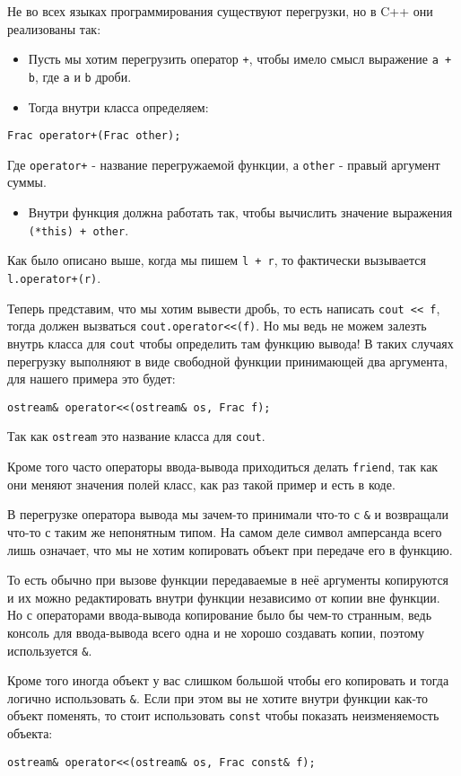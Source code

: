 Не во всех языках программирования существуют перегрузки, но в C++ они реализованы так:
\begin{itemize}
    \item Пусть мы хотим перегрузить оператор \texttt{+}, чтобы имело смысл выражение \texttt{a + b}, где \texttt{a} и \texttt{b} дроби.
    \item Тогда внутри класса определяем:
\end{itemize}
\begin{verbatim}
Frac operator+(Frac other);
\end{verbatim}
Где \texttt{operator+} - название перегружаемой функции, а \texttt{other} - правый аргумент суммы.
\begin{itemize}
    \item Внутри функция должна работать так, чтобы вычислить значение выражения \texttt{(*this) + other}.
\end{itemize}


Как было описано выше, когда мы пишем \texttt{l + r}, то фактически вызывается \texttt{l.operator+(r)}.

Теперь представим, что мы хотим вывести дробь, то есть написать \texttt{cout << f}, тогда должен вызваться \texttt{cout.operator<<(f)}. Но мы ведь не можем залезть внутрь класса для \texttt{cout} чтобы определить там функцию вывода! В таких случаях перегрузку выполняют в виде свободной функции принимающей два аргумента, для нашего примера это будет:
\begin{verbatim}
ostream& operator<<(ostream& os, Frac f);
\end{verbatim}
Так как \texttt{ostream} это название класса для \texttt{cout}.

Кроме того часто операторы ввода-вывода приходиться делать \texttt{friend}, так как они меняют значения полей класс, как раз такой пример и есть в коде.


В перегрузке оператора вывода мы зачем-то принимали что-то с \texttt{&} и возвращали что-то с таким же непонятным типом. На самом деле символ амперсанда всего лишь означает, что мы не хотим копировать объект при передаче его в функцию.

То есть обычно при вызове функции передаваемые в неё аргументы копируются и их можно редактировать внутри функции независимо от копии вне функции. Но с операторами ввода-вывода копирование было бы чем-то странным, ведь консоль для ввода-вывода всего одна и не хорошо создавать копии, поэтому используется \texttt{&}.

Кроме того иногда объект у вас слишком большой чтобы его копировать и тогда логично использовать \texttt{&}. Если при этом вы не хотите внутри функции как-то объект поменять, то стоит использовать \texttt{const} чтобы показать неизменяемость объекта:
\begin{verbatim}
ostream& operator<<(ostream& os, Frac const& f);
\end{verbatim}
